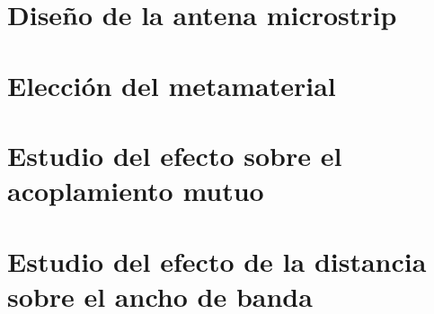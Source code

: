 \section{Diseño de la antena microstrip}
\label{sec_disenio_microstrip}
\section{Elección del metamaterial}
\label{sec_eleccion}
\section{Estudio del efecto sobre el acoplamiento mutuo}
\label{sec_estudio_acoplam_mutuo}
\section{Estudio del efecto de la distancia sobre el ancho de banda}
\label{sec_efecto_distancia}

